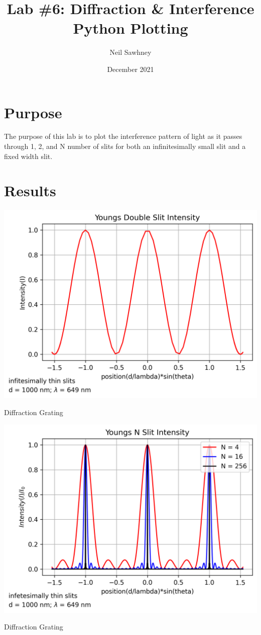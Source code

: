 \documentclass{report}
\title{Lab \#6: Diffraction \& Interference Python Plotting}
\author{Neil Sawhney}
\date{December 2021}
\begin{document}


\maketitle
\tableofcontents

\chapter{Purpose}
The purpose of this lab is to plot the interference pattern of light as it passes through 1, 2, and N number of slits for both an infinitesimally small slit and a fixed width slit. 



\chapter{Results}

\begin{table}[H]
    \centering
    \includegraphics[width = \textwidth]{plot1.png}
    \caption{Diffraction Grating}
\end{table}
\bigskip

\begin{table}[H]
    \centering
    \includegraphics[width = \textwidth]{plot2.png}
    \caption{Diffraction Grating}
\end{table}
\bigskip
\end{document}
